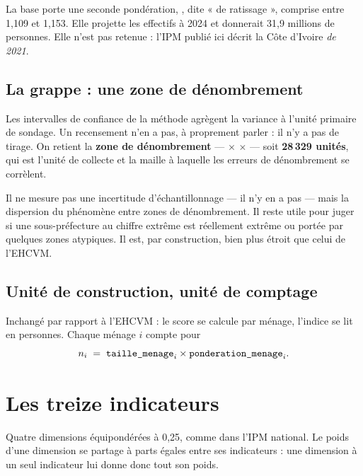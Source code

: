 \documentclass[11pt,a4paper]{article}
\begin{document}
\begin{attention}
La base porte une seconde pondération, , dite « de ratissage », comprise entre 1,109 et
1,153. Elle projette les effectifs à 2024 et donnerait 31,9 millions de personnes. Elle n'est pas
retenue : l'IPM publié ici décrit la Côte d'Ivoire \emph{de 2021}.
\end{attention}

\subsection{La grappe : une zone de dénombrement}

Les intervalles de confiance de la méthode agrègent la variance à l'unité primaire de sondage.
Un recensement n'en a pas, à proprement parler : il n'y a pas de tirage. On retient la
\textbf{zone de dénombrement} ---  $\times$  $\times$  --- soit
\textbf{28\,329 unités}, qui est l'unité de collecte et la maille à laquelle les erreurs de
dénombrement se corrèlent.

\begin{retenir}
Il ne mesure pas une incertitude d'échantillonnage --- il n'y en a pas --- mais la dispersion du
phénomène entre zones de dénombrement. Il reste utile pour juger si une sous-préfecture au chiffre
extrême est réellement extrême ou portée par quelques zones atypiques. Il est, par construction,
bien plus étroit que celui de l'EHCVM.
\end{retenir}

\subsection{Unité de construction, unité de comptage}

Inchangé par rapport à l'EHCVM : le score se calcule par ménage, l'indice se lit en personnes.
Chaque ménage $i$ compte pour
\[
n_i \;=\; \texttt{taille\_menage}_i \times \texttt{ponderation\_menage}_i .
\]

\section{Les treize indicateurs}
\label{sec:indicateurs}

Quatre dimensions équipondérées à 0,25, comme dans l'IPM national. Le poids d'une dimension se
partage à parts égales entre ses indicateurs : une dimension à un seul indicateur lui donne donc
tout son poids.
\end{document}

